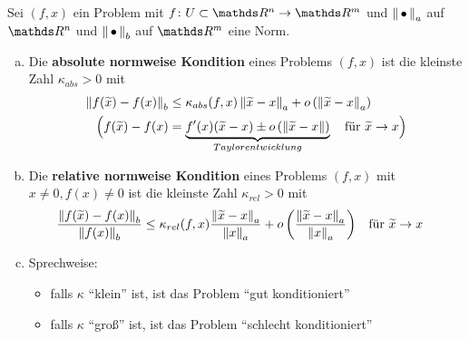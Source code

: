 


\begin{Defe}
  Sei $(f,x)$ ein Problem mit $f\colon U\subset \R^n \to \R^m$
  und $\nn_a$ auf $\R^n$ und $\nn_b$ auf $\R^m$ eine Norm.
  \begin{enumerate}[a)]
  \item Die \textbf{absolute normweise Kondition} eines Problems $(f,x)$ ist die kleinste Zahl 
    $\kappa _{abs} > 0 $ mit
    \begin{align}
      \nn[f(\widetilde{x})-f(x)]_b 
      &\leq \kappa_{abs}(f,x) \nn[\widetilde{x}-x]_a
        + o\left(\nn[\widetilde{x}-x]_a\right) 
        \label{III.2.2} \\\nonumber
      \Bigl(f(\widetilde{x})- f(x) 
      &=\underbrace{f'(x)(\widetilde{x}-x)
        \pm o\left(\nn[\widetilde{x}-x]\right)}_{Taylorentwicklung}
        \quad \text{für }\widetilde{x}\to x \Bigr)
    \end{align}
  \item Die \textbf{relative normweise Kondition} eines Problems $(f,x)$  mit $x\neq 0, f(x) \neq 0$
    ist die kleinste Zahl 
    $\kappa _{rel} > 0 $ mit
    \begin{align}
      \frac{\nn[f(\widetilde{x})-f(x)]_b}{\nn[f(x)]_b}
      &\leq \kappa _{rel}(f,x)\frac{\nn[\widetilde{x}-x]_a}{\nn[x]_a}
        + o\left(\frac{\nn[\widetilde{x}-x]_a}{\nn[x]_a}\right) \label{III.2.3}
      &&	\text{für } \widetilde{x} \to x
    \end{align}
  \item Sprechweise:
    \begin{itemize}
    \item falls $\kappa$ \enquote{klein} ist,
      ist das Problem \enquote{gut konditioniert}
    \item falls $\kappa$ \enquote{groß} ist, 
      ist das Problem \enquote{schlecht konditioniert}
    \end{itemize}
  \end{enumerate}
\end{Defe}

